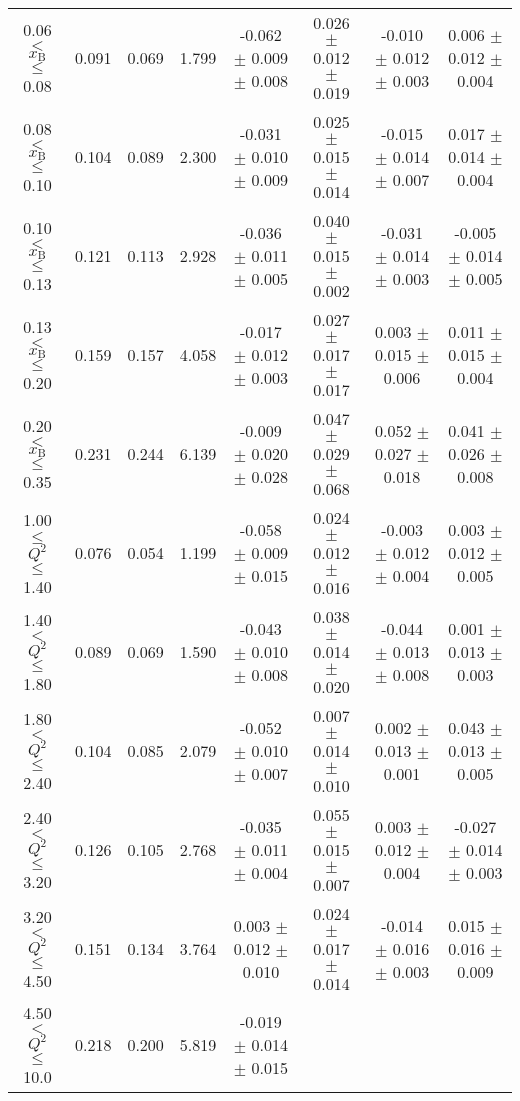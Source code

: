 \begin{table}[width=15cm]
\begin{center}
{\begin{tabular}{|c|c|c|c|c|c|c|c|}
0.06 $<$ $x_{\textrm{B}}$ $\leqslant$ 0.08 &  0.091 & 0.069 &  1.799 &   -0.062  $\pm$  0.009  $\pm$   0.008 &
0.026  $\pm$  0.012  $\pm$   0.019 & -0.010  $\pm$ 0.012  $\pm$   0.003 & 0.006   $\pm$  0.012   $\pm$   0.004\\
0.08 $<$ $x_{\textrm{B}}$ $\leqslant$ 0.10 &  0.104 & 0.089 &  2.300 &  -0.031  $\pm$  0.010  $\pm$   0.009 & 
0.025  $\pm$  0.015  $\pm$   0.014 & -0.015 $\pm$  0.014 $\pm$    0.007 & 0.017   $\pm$  0.014    $\pm$  0.004\\
0.10 $<$ $x_{\textrm{B}}$ $\leqslant$ 0.13 &  0.121 &  0.113 &  2.928 &  -0.036  $\pm$  0.011  $\pm$   0.005 & 
0.040  $\pm$  0.015 $\pm$   0.002 & -0.031 $\pm$  0.014  $\pm$   0.003 & -0.005   $\pm$  0.014  $\pm$    0.005\\
0.13 $<$ $x_{\textrm{B}}$ $\leqslant$ 0.20 &  0.159 & 0.157 &  4.058&   -0.017   $\pm$ 0.012  $\pm$   0.003 & 
0.027  $\pm$  0.017 $\pm$    0.017 & 0.003  $\pm$  0.015  $\pm$   0.006 & 0.011   $\pm$  0.015   $\pm$  0.004\\
0.20 $<$ $x_{\textrm{B}}$ $\leqslant$ 0.35 &  0.231 & 0.244 &  6.139 &  -0.009 $\pm$  0.020   $\pm$  0.028 & 
0.047  $\pm$  0.029   $\pm$    0.068 & 0.052  $\pm$  0.027  $\pm$   0.018 & 0.041  $\pm$   0.026  $\pm$   0.008\\
\hline
1.00 $\leqslant$ $Q^{2}$ $\leqslant$ 1.40 &  0.076 & 0.054  & 1.199 &  -0.058  $\pm$  0.009  $\pm$   0.015 & 
0.024  $\pm$  0.012  $\pm$   0.016 &  -0.003 $\pm$  0.012  $\pm$  0.004 & 0.003  $\pm$  0.012   $\pm$   0.005\\
1.40 $<$ $Q^{2}$ $\leqslant$ 1.80 &  0.089 & 0.069 &  1.590 &  -0.043  $\pm$  0.010  $\pm$   0.008 & 
0.038  $\pm$  0.014  $\pm$   0.020 & -0.044  $\pm$  0.013  $\pm$  0.008 & 0.001  $\pm$  0.013   $\pm$  0.003\\
1.80 $<$ $Q^{2}$ $\leqslant$ 2.40 &  0.104 & 0.085 &  2.079 &  -0.052  $\pm$  0.010  $\pm$   0.007 &
 0.007  $\pm$  0.014  $\pm$   0.010 & 0.002 $\pm$   0.013  $\pm$  0.001 & 0.043  $\pm$   0.013  $\pm$  0.005\\
2.40 $<$ $Q^{2}$ $\leqslant$ 3.20 &  0.126 & 0.105  & 2.768 &  -0.035 $\pm$   0.011  $\pm$   0.004 &  
0.055  $\pm$  0.015  $\pm$   0.007 & 0.003  $\pm$  0.012  $\pm$  0.004 & -0.027  $\pm$  0.014  $\pm$  0.003\\
3.20 $<$ $Q^{2}$ $\leqslant$ 4.50 &  0.151 & 0.134 &  3.764 &  0.003  $\pm$  0.012   $\pm$  0.010 & 
0.024 $\pm$   0.017  $\pm$   0.014 & -0.014  $\pm$  0.016 $\pm$ 0.003 & 0.015   $\pm$  0.016  $\pm$  0.009\\
4.50 $<$ $Q^{2}$ $\leqslant$ 10.0 &  0.218 & 0.200 &  5.819 &  -0.019  $\pm$  0.014  $\pm$   0.015 & 

\end{tabular}}
\end{center}
\end{table}

